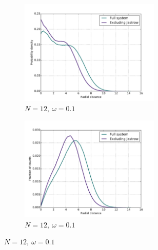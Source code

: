 \documentclass[english, a4paper]{article}
\begin{document}
\begin{figure}[H]
	\vspace{1mm}
	
	\begin{subfigure}{0.5\textwidth}
		\includegraphics[width=\textwidth, height=5cm]{figures/radialDistribution/OneBodyDensityN12w10Se7.pdf}
		\caption{$N=12,\:\omega=0.1$}
	\end{subfigure}
	\begin{subfigure}{0.5\textwidth}
		\includegraphics[width=\textwidth, height= 5cm]{figures/radialDistribution/radialDistributionN12w10Se7.pdf}
		\caption{$N=12,\:\omega=0.1$}
	\end{subfigure}
	
	\vspace{1mm}
	

\end{figure}
\end{document}
